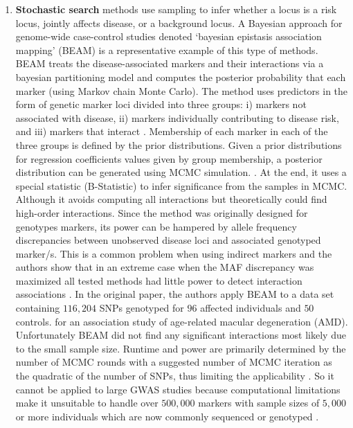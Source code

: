 \begin{enumerate}
	\item \textbf{Stochastic search} methods use sampling to infer whether a locus is a risk locus, jointly affects disease, or a background locus.
A Bayesian approach for genome-wide case-control studies denoted `bayesian epistasis association mapping' (BEAM) \cite{zhang2007bayesian} is a representative example of this type of methods.
 BEAM treats the disease-associated markers and their interactions via a bayesian partitioning model and computes the posterior probability that each marker (using Markov chain Monte Carlo).
The method uses predictors in the form of genetic marker loci divided into three groups: i) markers not associated with disease, ii) markers individually contributing to disease risk, and iii) markers that interact \cite{zhang2007bayesian}.
Membership of each marker in each of the three groups is defined by the prior distributions.
Given a prior distributions for regression coefficients values given by group membership, a posterior distribution can be generated using MCMC simulation. \cite{cordell2009detecting}.
At the end, it uses a special statistic (B-Statistic) to infer significance from the samples in MCMC. 
Although it avoids computing all interactions but theoretically could find high-order interactions. 
Since the method was originally designed for genotypes markers, its power can be hampered by allele frequency discrepancies between unobserved disease loci and associated genotyped marker/s\cite{zhang2007bayesian}.
This is a common problem when using indirect markers and the authors show that in an extreme case when the MAF discrepancy was maximized all tested methods had little power to detect interaction associations \cite{zhang2007bayesian}.
In the original paper, the authors apply BEAM to a data set containing $116,204$ SNPs genotyped for $96$ affected individuals and $50$ controls. for an association study of age-related macular degeneration (AMD).
Unfortunately BEAM did not find any significant interactions \cite{zhang2007bayesian} most likely due to the small sample size.
Runtime and power are primarily determined by the number of MCMC rounds with a suggested number of MCMC iteration as the quadratic of the number of SNPs, thus limiting the applicability \cite{li2011detecting}.
So it cannot be applied to large GWAS studies because computational limitations make it unsuitable to handle over $500,000$ markers with sample sizes of $5,000$ or more individuals which are now commonly sequenced or genotyped \cite{cordell2009detecting}.


\end{enumerate}
